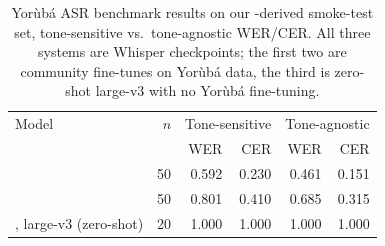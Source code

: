 \begin{table}[t]
\centering
\begin{tabular}{lrrrrr}
\toprule
Model & $n$ & \multicolumn{2}{c}{Tone-sensitive} & \multicolumn{2}{c}{Tone-agnostic} \\
 & & WER & CER & WER & CER \\
\midrule
\citet{whisper-small-yoruba} & 50 & 0.592 & 0.230 & 0.461 & 0.151 \\
\citet{whisper-base-yoruba-colab} & 50 & 0.801 & 0.410 & 0.685 & 0.315 \\
\citet{whisper}, large-v3 (zero-shot) & 20 & 1.000 & 1.000 & 1.000 & 1.000 \\
\bottomrule
\end{tabular}
\caption{Yor\`ub\'a ASR benchmark results on our \citet{shunyalabs-yoruba}-derived
smoke-test set, tone-sensitive vs.\ tone-agnostic WER/CER. All three systems are
Whisper checkpoints; the first two are community fine-tunes on Yor\`ub\'a data,
the third is zero-shot large-v3 with no Yor\`ub\'a fine-tuning.}
\label{tab:asr-results}
\end{table}

